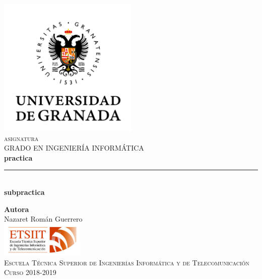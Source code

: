 \documentclass[11pt,a4paper]{article}
\begin{document}
\begin{titlepage}

\begin{minipage}{\textwidth}

\centering
\includegraphics[width=0.5\textwidth]{img/logo.png}\\

\textsc{\Large asignatura\\[0.2cm]}
\textsc{GRADO EN INGENIERÍA INFORMÁTICA}\\[1cm]

{\Huge\bfseries practica\\}
\noindent\rule[-1ex]{\textwidth}{3pt}\\[3.5ex]
{\large\bfseries subpractica}
\end{minipage}

\vspace{1.5cm}
\begin{minipage}{\textwidth}
\centering

\textbf{Autora}\\ {Nazaret Román Guerrero}\\[2.5ex]
\includegraphics[width=0.3\textwidth]{img/etsiit.jpeg}\\[0.1cm]
\vspace{1cm}
\textsc{Escuela Técnica Superior de Ingenierías Informática y de Telecomunicación}\\
\vspace{1cm}
\textsc{Curso 2018-2019}
\end{minipage}
\end{titlepage}

\tableofcontents
\thispagestyle{empty}
\end{document}
